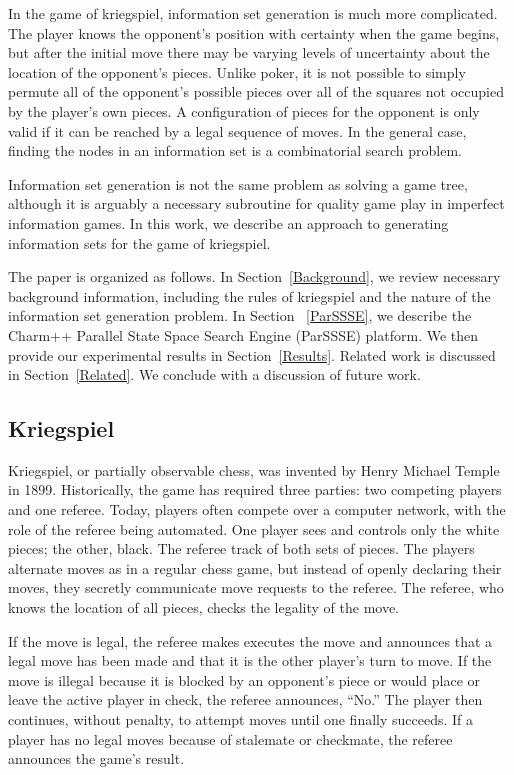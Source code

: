 \documentclass[times, 10pt,twocolumn]{article}
\begin{document}
In the game of kriegspiel, information set generation is much more complicated.  The player knows the opponent's position with
certainty when the game begins, but after the initial move there may be varying levels of uncertainty about the location
of the opponent's pieces.  Unlike poker, it is not possible to simply permute all of the opponent's possible pieces over
all of the squares not occupied by the player's own pieces.  A configuration of pieces for the opponent is only valid if
it can be reached by a legal sequence of moves.  In the general case, finding the nodes in an information set is a
combinatorial search problem.

Information set generation is not the same problem as solving a game tree, although it is arguably a necessary
subroutine for quality game play in imperfect information games.  In this work, we describe an approach to generating
information sets for the game of kriegspiel. 

The paper is organized as follows.  In Section~\ref{Background}, we review necessary background information, including the rules of kriegspiel and the nature of the information set generation problem.  In Section ~\ref{ParSSSE}, we describe the {\sc Charm++} Parallel State Space Search Engine (ParSSSE) platform.  We then provide our experimental results in Section~\ref{Results}.  Related work is discussed in Section~\ref{Related}.  We conclude with a discussion of future work.

\label{Background}
\subsection{Kriegspiel}
Kriegspiel, or partially observable chess,  was invented by Henry Michael Temple in 1899.  Historically, the
game has required three parties: two competing players and one referee.  Today,
players often compete over a computer network, with the role of the referee
being automated.  One player sees and controls only the white pieces; the
other, black.  The referee track of both sets of pieces.  The players alternate
moves as in a regular chess game, but instead of openly declaring their moves,
they secretly communicate move requests to the referee.  The referee, who knows
the location of all pieces, checks the legality of the move.  

If the move is legal, the referee makes executes the move and announces that a
legal move has been made and that it is the other player's turn to move.  If
the move is illegal because it is blocked by an opponent's piece or would place
or leave the active player in check, the referee announces, ``No.''  The player
then continues, without penalty, to attempt moves until one finally succeeds.
If a player has no legal moves because of stalemate or checkmate, the referee
announces the game's result.
\end{document}
